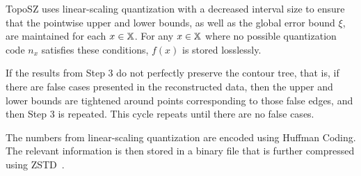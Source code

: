  TopoSZ uses linear-scaling quantization with a decreased interval size to ensure that the pointwise upper and lower bounds, as well as the global error bound $\xi$, are maintained for each $x \in \mathbb{X}$. For any $x \in \mathbb{X}$ where no possible quantization code $n_x$ satisfies these conditions, $f(x)$ is stored losslessly.

If the results from Step 3 do not perfectly preserve the contour tree, that is, if there are false cases presented in the reconstructed data, then the upper and lower bounds are tightened around points corresponding to those false edges, and then Step 3 is repeated. This cycle repeats until there are no false cases. 

 The numbers from linear-scaling quantization are encoded using Huffman Coding. The relevant information is then stored in a binary file that is further compressed using ZSTD~\cite{collet2018zstandard}.